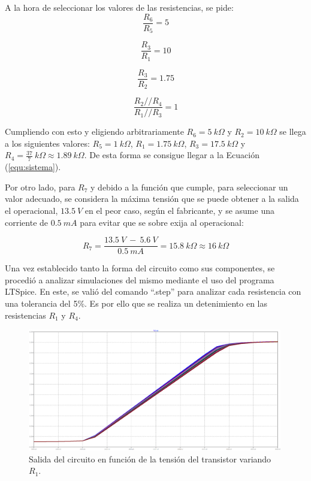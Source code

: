 \documentclass[a4paper]{article}
\begin{document}
A la hora de seleccionar los valores de las resistencias, se pide:
\begin{equation}
	\frac{R_6}{R_5} = 5
	\label{equ:condm1-1}
\end{equation}

\begin{equation}
	\frac{R_3}{R_1} = 10
	\label{equ:condm1-2}
\end{equation}

\begin{equation}
	\frac{R_3}{R_2} = 1.75
	\label{equ:condm1-3}
\end{equation}

\begin{equation}
	\frac{R_2 // R_4}{R_1 // R_3} = 1
	\label{equ:condm1-4}
\end{equation}

Cumpliendo con esto y eligiendo arbitrariamente $R_6 = 5 \ k\Omega$ y $R_2 = 10 \ k\Omega$ se llega a los siguientes valores: $R_5 = 1 \ k\Omega$, $R_1 = 1.75 \ k\Omega$, $R_3 = 17.5 \ k\Omega$ y $R_4 = \frac{37}{7} \ k\Omega \approx 1.89 \ k\Omega$. De esta forma se consigue llegar a la Ecuación (\ref{equ:sistema}).

Por otro lado, para $R_7$ y debido a la función que cumple, para seleccionar un valor adecuado, se considera la máxima tensión que se puede obtener a la salida el operacional, $13.5 \ V$ en el peor caso, según el fabricante, y se asume una corriente de $0.5 \ mA$ para evitar que se sobre exija al operacional:

\begin{equation}
	R_7 = \frac{13.5 \ V \ - \ 5.6 \ V}{0.5 \ mA} = 15.8 \ k\Omega \approx 16 \ k\Omega
	\label{equ:condm1-5}
\end{equation}

Una vez establecido tanto la forma del circuito como sus componentes, se procedió a analizar simulaciones del mismo mediante el uso del programa LTSpice. En este, se valió del comando ``.step'' para analizar cada resistencia con una tolerancia del 5\%. Es por ello que se realiza un detenimiento en las resistencias $R_1$ y $R_4$.

\begin{figure}[H]
	\centering
	\includegraphics[width=0.99\textwidth]{Ejercicio6/Imagenes/StepR1-M1.png}
	\caption{Salida del circuito en función de la tensión del transistor variando $R_1$.}
	\label{fig:r1-M1}
\end{figure}
\end{document}
